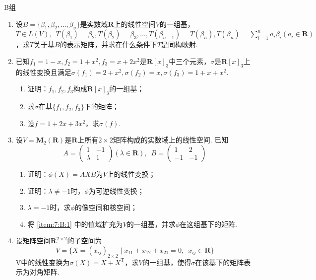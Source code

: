 \centerline{\heiti B组}
\begin{enumerate}
    \item 设$B=\{\beta_1,\beta_2,\ldots,\beta_n\}$是实数域$\mathbf{R}$上的线性空间$V$的一组基，$T \in L(V),\enspace T(\beta_1)=\beta_2,T(\beta_2)=\beta_3,\ldots,T(\beta_{n-1})=T(\beta_n),T(\beta_n)=\displaystyle\sum_{i=1}^{n}a_i\beta_i(a_i \in \mathbf{R})$，求$T$关于基$B$的表示矩阵，并求在什么条件下$T$是同构映射.

    \item 已知$f_1=1-x,f_2=1+x^2,f_3=x+2x^2$是$\mathbf{R}[x]_3$中三个元素，$\sigma$是$\mathbf{R}[x]_3$上的线性变换且满足$\sigma(f_1)=2+x^2,\sigma(f_2)=x,\sigma(f_3)=1+x+x^2$.
          \begin{enumerate}
              \item 证明：$f_1,f_2,f_3$构成$\mathbf{R}[x]_3$的一组基；

              \item 求$\sigma$在基$\{f_1,f_2,f_3\}$下的矩阵；

              \item 设$f=1+2x+3x^2$，求$\sigma(f)$.
          \end{enumerate}

    \item 设$V=\mathbf{M}_2(\mathbf{R})$是$\mathbf{R}$上所有$2 \times 2$矩阵构成的实数域上的线性空间. 已知
          \[A=\begin{pmatrix}1 & -1 \\ \lambda & 1 \end{pmatrix}(\lambda \in \mathbf{R}),\enspace B=\begin{pmatrix}1 & 2 \\ -1 & -1 \end{pmatrix}\]
          \begin{enumerate}
              \item 证明：$\phi(X)=AXB$为$V$上的线性变换；

              \item 证明：$\lambda\neq-1$时，$\phi$为可逆线性变换；

              \item \label{item:7:B:1}
                    $\lambda=-1$时，求$\phi$的像空间和核空间；

              \item 将 \ref*{item:7:B:1} 中的值域扩充为$V$的一组基，并求$\phi$在这组基下的矩阵.
          \end{enumerate}

    \item 设矩阵空间$\mathbf{R}^{2\times 2}$的子空间为
          \[V=\{X=(x_{ij})_{2\times 2} \mid x_{11}+x_{12}+x_{21}=0,\enspace x_{ij}\in \mathbf{R}\}\]
          V中的线性变换为$\sigma(X)=X+X^\mathrm{T}$，求$V$的一组基，使得$\sigma$在该基下的矩阵表示为对角矩阵.


\end{enumerate}
